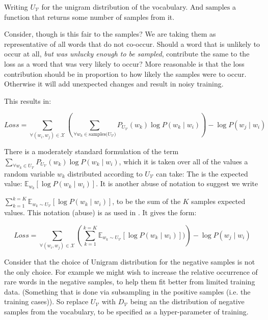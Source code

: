 \documentclass[parskip]{komatufte}
\begin{document}
Writing $U_{\mathcal{V}}$ for the unigram distribution of the vocabulary.
And $\text{samples}$ a function that returns some number of samples from it.

Consider, though is this fair to the samples?
We are taking them as representative of all words that do not co-occur.
Should a word that is unlikely to occur at all, \emph{but was unlucky enough to be sampled}, contribute the same to the loss as a word that was very likely to occur?
More reasonable is that the loss contribution should be in proportion to how likely the samples were to occur.
Otherwise it will add unexpected changes and result in noisy training.

This results in:

\begin{equation}
Loss = \sum_{\forall (w_i,w_j)\in \mathcal{X}} 
\left(\sum_{\forall w_k \in \text{samples($U_{\mathcal{V}}$)}}
P_{U_\mathcal{V}}(w_k) \log P(w_k\mid w_i) \right)
-\log P(w_j\mid w_i)
\end{equation}

There is a moderately standard formulation of the term $\sum_{\forall w_k \in U_{\mathcal{V}}}
P_{U_\mathcal{V}}(w_k) \log P(w_k\mid w_i)$,
which it is taken over all of the values a random variable $w_k$  distributed according to $U_{\mathcal{V}}$ can take:
The is the expected value: $\mathbb{E}_{w_k} [\log P(w_k\mid w_i)]$.
It is another abuse of notation to suggest we write

$\sum_{k=1}^{k=K} \mathbb{E}_{w_k \sim U_{\mathcal{V}}} [\log P(w_k\mid w_i)]$,
to be the sum of the $K$ samples expected values.
This notation (abuse) is as used in .
It gives the form:

\begin{equation}
Loss = \sum_{\forall (w_i,w_j)\in \mathcal{X}} 
\left(\sum_{k=1}^{k=K} \mathbb{E}_{w_k \sim U_{\mathcal{V}}} [\log P(w_k\mid w_i)]) \right)
-\log P(w_j\mid w_i)
\end{equation}

Consider that the choice of Unigram distribution for the negative samples is not the only choice.
For example we might wish to increase the relative occurrence of rare words in the negative samples, to help them fit better from limited training data.
(Something that is done via subsampling in the positive samples (i.e. the training cases)).
So replace $U_{\mathcal{V}}$ with $D_{\mathcal{V}}$ being an the distribution of negative samples from the vocabulary,
to be specified as a hyper-parameter of training.
\end{document}
